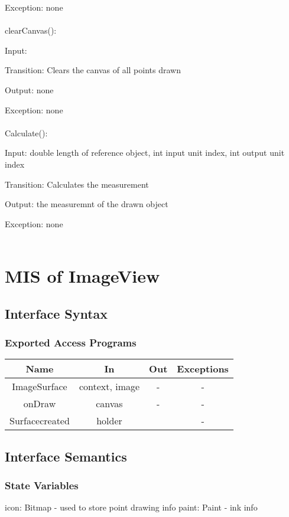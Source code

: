 \documentclass[12,english]{article}
\begin{document}
		Exception: none\\ 
		\\
		clearCanvas():
		
		Input: 
		
		Transition: Clears the canvas of all points drawn
		
		Output: none
		
		Exception: none\\ 
		\\
		Calculate():
		
		Input: double length of reference object, int input unit index, int output unit index 
		
		Transition: Calculates the measurement
		
		Output: the measuremnt of the drawn object
		
		Exception: none\\ 
		\\
	
	
	
\section{MIS of ImageView}
		\subsection{Interface Syntax}
		\subsubsection{Exported Access Programs}
		\begin{tabular}[pos]{|c|c|c|c|}
			
			\hline
			\textbf{Name}& \textbf{In} & \textbf{Out} & \textbf{Exceptions} \\ \hline
			ImageSurface & context, image & - & -\\ \hline
			onDraw & canvas & - & -\\ \hline
			Surfacecreated & holder &  & -\\ \hline

			
		\end{tabular}
		
		\subsection{Interface Semantics}
		\subsubsection{State Variables}
	    icon: Bitmap - used to store point drawing info
		paint: Paint - ink info\\
\end{document}
